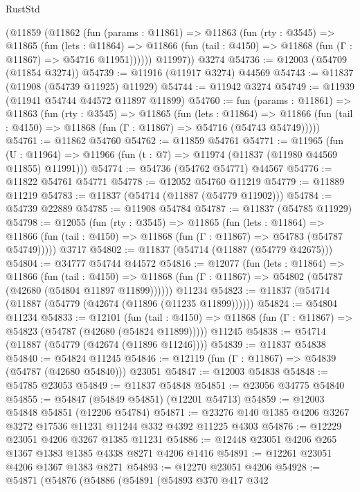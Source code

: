 \begin{lexlean}{RustStd}
\begin{coremodule}
{\begin{coremodule}
{{{{{{{{{{{{{{{{{{{{{{{{{{{{{{{{{{{{{{{{{{{{{{{{{{      (@11859
        (@11862
          (fun (params : @11861) =>
          @11863
            (fun (rty : @3545) =>
            @11865
              (fun (lets : @11864) =>
              @11866 (fun (tail : @4150) => @11868 (fun (Γ : @11867) => @54716 @11951))))))
        @11997))
    @3274
@54736 := @12003 (@54709 (@11854 @3274))
@54739 := @11916 (@11917 @3274) @44569
@54743 := @11837 (@11908 (@54739 @11925) @11929)
@54744 := @11942 @3274
@54749 := @11939 (@11941 @54744 @44572 @11897 @11899)
@54760 := fun (params : @11861) =>
  @11863
    (fun (rty : @3545) =>
    @11865
      (fun (lets : @11864) =>
      @11866 (fun (tail : @4150) => @11868 (fun (Γ : @11867) => @54716 (@54743 @54749)))))
@54761 := @11862 @54760
@54762 := @11859 @54761
@54771 := @11965
    (fun (U : @11964) => @11966 (fun (t : @7) => @11974 (@11837 (@11980 @44569 @11855) @11991)))
@54774 := @54736 (@54762 @54771) @44567
@54776 := @11822 @54761 @54771
@54778 := @12052 @54760 @11219
@54779 := @11889 @11219
@54783 := @11837 (@54714 (@11887 (@54779 @11902)))
@54784 := @54739 @22889
@54785 := @11908 @54784
@54787 := @11837 (@54785 @11929)
@54798 := @12055
    (fun (rty : @3545) =>
    @11865
      (fun (lets : @11864) =>
      @11866 (fun (tail : @4150) => @11868 (fun (Γ : @11867) => @54783 (@54787 @54749)))))
    @3717
@54802 := @11837 (@54714 (@11887 (@54779 @42675)))
@54804 := @34777 @54744 @44572
@54816 := @12077
    (fun (lets : @11864) =>
    @11866
      (fun (tail : @4150) =>
      @11868 (fun (Γ : @11867) => @54802 (@54787 (@42680 (@54804 @11897 @11899))))))
    @11234
@54823 := @11837 (@54714 (@11887 (@54779 (@42674 (@11896 (@11235 @11899))))))
@54824 := @54804 @11234
@54833 := @12101
    (fun (tail : @4150) => @11868 (fun (Γ : @11867) => @54823 (@54787 (@42680 (@54824 @11899)))))
    @11245
@54838 := @54714 (@11887 (@54779 (@42674 (@11896 @11246))))
@54839 := @11837 @54838
@54840 := @54824 @11245
@54846 := @12119 (fun (Γ : @11867) => @54839 (@54787 (@42680 @54840))) @23051
@54847 := @12003 @54838
@54848 := @54785 @23053
@54849 := @11837 @54848
@54851 := @23056 @34775 @54840
@54855 := @54847 (@54849 @54851) (@12201 @54713)
@54859 := @12003 @54848 @54851 (@12206 @54784)
@54871 := @23276 @140 @1385 @4206 @3267 @3272 @17536 @11231 @11244 @332 @4392 @11225 @4303
@54876 := @12229 @23051 @4206 @3267 @1385 @11231
@54886 := @12448 @23051 @4206 @265 @1367 @1383 @1385 @4338 @8271 @4206 @1416
@54891 := @12261 @23051 @4206 @1367 @1383 @8271
@54893 := @12270 @23051 @4206
@54928 := @54871
    (@54876
      (@54886
        (@54891
          (@54893
            @370
            @417
            @342
}}}}}}}}}}}}}}}}}}}}}}}}}}}}}}}}}}}}}}}}}}}}}}}}}}
\end{coremodule}}
\end{coremodule}
\end{lexlean}
